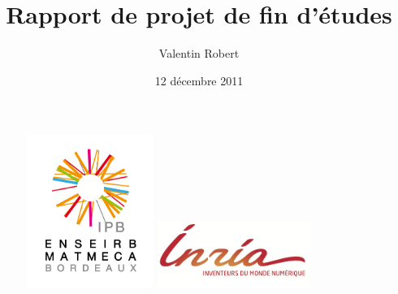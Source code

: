 \documentclass{article}
\title{Rapport de projet de fin d'études}
\author{Valentin Robert}
\date{12 décembre 2011}
\begin{document}
\setlength{\droptitle}{-3cm}
\maketitle

\begin{figure}[!h]
\begin{minipage}[t]{0.5\linewidth}
\vspace{0pt}
\centering
\includegraphics[height=5cm]{enseirb.jpg}
\end{minipage}
\hspace{0.5cm}
\begin{minipage}[t]{0.5\linewidth}
\vspace{2cm}
\centering
\includegraphics[width=5cm]{inria.jpg}
\end{minipage}
\end{figure}
\end{document}
